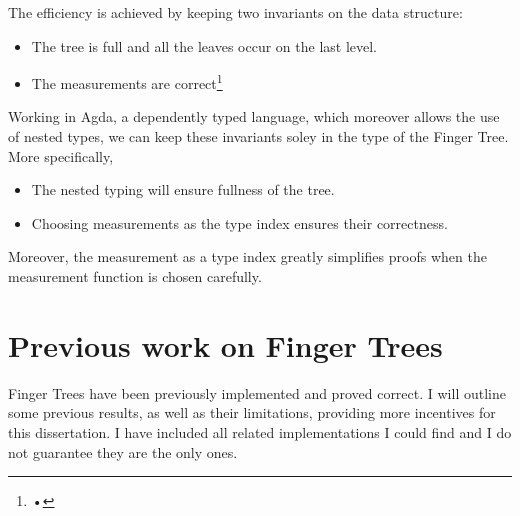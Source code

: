 \documentclass[12pt,twoside,notitlepage]{report}
\begin{document}
The efficiency is achieved by keeping two invariants on the data structure:
\begin{itemize}
	\item The tree is full and all the leaves occur on the last level. 
	\item The measurements are correct\footnote{•}
\end{itemize}

Working in Agda, a dependently typed language, which moreover allows the use of nested types, we can keep these invariants soley in the type of the Finger Tree. More specifically,
\begin{itemize}
	\item The nested typing will ensure fullness of the tree.
	\item Choosing measurements as the type index ensures their correctness.  
\end{itemize} 

Moreover, the measurement as a type index greatly simplifies proofs when the measurement function is chosen carefully.

\section{Previous work on Finger Trees} 
Finger Trees have been previously implemented and proved correct. I will outline some previous results, as well as their limitations, providing more incentives for this dissertation. I have included all related implementations I could find and I do not guarantee they are the only ones.
\end{document}
